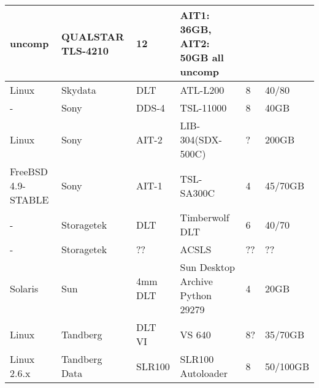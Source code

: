 \begin{longtable}{|p{0.6in}|p{0.8in}|p{1.9in}|p{0.8in}|p{0.5in}|p{0.75in}|}
{uncomp } & {QUALSTAR TLS-4210 } & {12} & {AIT1: 36GB, AIT2: 50GB all uncomp  }\\
 \hline {Linux } & {Skydata } & {DLT  } & {ATL-L200 } & {8} & {40/80  } \\
 \hline {-  } & {Sony  } & {DDS-4 } & {TSL-11000 } & {8} & {40GB  } \\
 \hline {Linux } & {Sony  } & {AIT-2 } & {LIB-304(SDX-500C) } & {?} & {200GB  } \\
 \hline {FreeBSD 4.9-STABLE } & {Sony } & {AIT-1 } & {TSL-SA300C } & {4} & {45/70GB  }\\
 \hline {- } & {Storagetek } & {DLT } & {Timberwolf DLT } & {6} & {40/70  } \\
 \hline {- } & {Storagetek } & {?? } & {ACSLS } & {??} & {??  } \\
 \hline {Solaris } & {Sun } & {4mm DLT } & {Sun Desktop Archive Python 29279 } & {4} & {20GB  } \\
 \hline {Linux } & {Tandberg } & {DLT VI } & {VS 640 } & {8?} & {35/70GB  } \\
 \hline {Linux 2.6.x } & {Tandberg Data } & {SLR100 } & {SLR100 Autoloader } & {8} & {50/100GB }\\ 
\hline 

\end{longtable}
